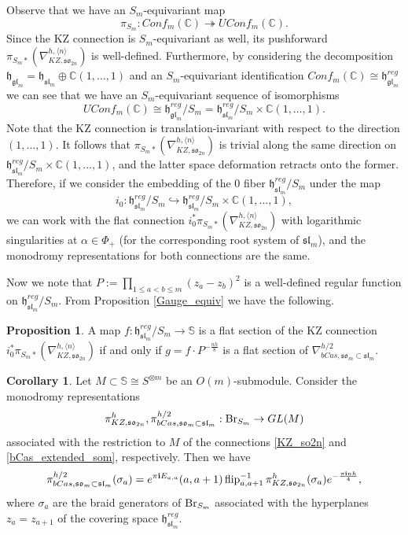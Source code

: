 \documentclass[10pt]{amsart}
\numberwithin{equation}{section}
\theoremstyle{definition}
\newtheorem{corollary}[theorem]{Corollary}
\newtheorem{proposition}[theorem]{Proposition}
\def\C{{\mathbb C}}
\newcommand{\slm}{\mathfrak{sl}_{m}}
\newcommand{\glm}{\mathfrak{gl}_{m}}
\newcommand{\son}[1][2n]{\mathfrak{so}_{#1}}
\newcommand{\som}[1][m]{\mathfrak{so}_{#1}}
\newcommand{\flip}{\operatorname{flip}}
\newcommand{\imag}{\textbf{i}}
\newcommand{\howespin}{\boldsymbol{\mathbb{S}}}
\begin{document}
Observe that we have an $S_m$-equivariant map
\[
\pi_{S_m}: Conf_m(\C)\twoheadrightarrow UConf_m(\C).
\]
Since the KZ connection is $S_m$-equivariant as well, its pushforward $\pi_{S_m*}(\nabla_{KZ,\son}^{h,\langle n\rangle})$ is well-defined. Furthermore, by considering the decomposition $\mathfrak{h}_{\glm}=\mathfrak{h}_{\slm}\oplus \C(1,\dots,1)$ and an $S_m$-equivariant identification $Conf_m(\C) \cong \mathfrak{h}_{\glm}^{reg}$ we can see that we have an $S_m$-equivariant sequence of isomorphisms
\[
UConf_m(\C)\cong \mathfrak{h}_{\glm}^{reg}/S_m = \mathfrak{h}_{\slm}^{reg}/ S_m \times \C(1,\dots, 1).
\]
Note that the KZ connection is translation-invariant with respect to the direction $(1,\dots,1)$. It follows that $\pi_{S_m*}(\nabla_{KZ,\son}^{h,\langle n\rangle})$ is trivial along the same direction on $\mathfrak{h}_{\slm}^{reg}/ S_m \times \C(1,\dots, 1)$, and the latter space deformation retracts onto the former. Therefore, if we consider the embedding of the $0$ fiber $\mathfrak{h}_{\slm}^{reg}/S_m$ under the map
\[
i_0:\mathfrak{h}_{\slm}^{reg}/S_m \hookrightarrow \mathfrak{h}_{\slm}^{reg}/S_m \times \C(1,\dots, 1),
\]
we can work with the flat connection $i_0^*\pi_{S_m*}(\nabla_{KZ,\son}^{h,\langle n\rangle})$ with logarithmic singularities at $\alpha\in \Phi_+$ (for the corresponding root system of $\slm$), and the monodromy representations for both connections are the same.

Now we note that $P:=\prod_{1\le a<b\le m}(z_a-z_b)^2$ is a well-defined regular function on $\mathfrak{h}_{\slm}^{reg}/S_m$. From Proposition \ref{Gauge_equiv} we have the following.

\begin{proposition}\label{KZ_bCas_flat_sections}
    A map $f:\mathfrak{h}_{\slm}^{reg}/S_m \rightarrow \mathbb{S}$ is a flat section of the KZ connection $i_0^*\pi_{S_m*}(\nabla_{KZ,\son}^{h,\langle n\rangle})$ if and only if $g=f\cdot P^{-\frac{nh}{8}}$ is a flat section of $\nabla_{bCas,\som\subset\slm}^{h/2}$.
\end{proposition}

\begin{corollary}\label{Br_S_m_monodromy}
    Let $M\subset \howespin\cong S^{\otimes m}$ be an $O(m)$-submodule.
    Consider the monodromy representations
    \begin{equation}
        \pi_{KZ,\son}^h, \pi_{bCas,\som\subset \slm}^{h/2}: {\rm Br}_{S_m} \rightarrow GL(M)
    \end{equation}
    associated with the restriction to $M$ of the connections \eqref{KZ_so2n} and \eqref{bCas_extended_som}, respectively. Then we have
\[
\pi_{bCas, \som\subset \slm}^{h/2}(\sigma_a)= e^{\pi {\bf i}E_{a,a}} (a,a+1)\flip^{-1}_{a,a+1} \pi_{KZ, \son}^h(\sigma_a)e^{-\frac{\pi \imag n h}{4}},
\]
    where $\sigma_a$ are the braid generators of ${\rm Br}_{S_m}$ associated with the hyperplanes $z_a=z_{a+1}$ of the covering space $\mathfrak{h}_{\slm}^{reg}$.
\end{corollary}
\end{document}
